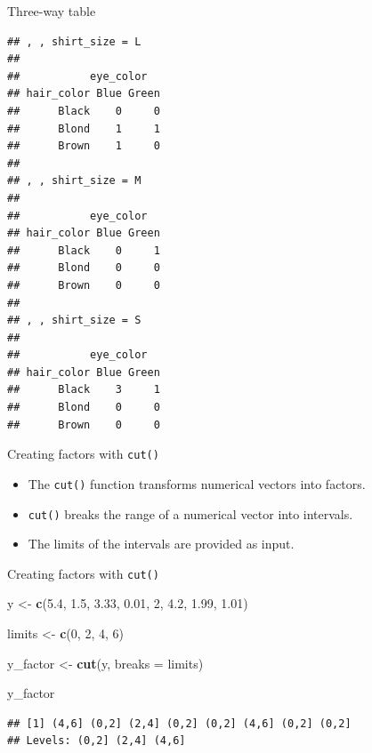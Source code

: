 \documentclass[ignorenonframetext,]{beamer}
\newenvironment{Shaded}{\begin{snugshade}}{\end{snugshade}}
\newcommand{\DataTypeTok}[1]{\textcolor[rgb]{0.13,0.29,0.53}{#1}}
\newcommand{\DecValTok}[1]{\textcolor[rgb]{0.00,0.00,0.81}{#1}}
\newcommand{\FloatTok}[1]{\textcolor[rgb]{0.00,0.00,0.81}{#1}}
\newcommand{\KeywordTok}[1]{\textcolor[rgb]{0.13,0.29,0.53}{\textbf{#1}}}
\newcommand{\NormalTok}[1]{#1}
\newcommand{\StringTok}[1]{\textcolor[rgb]{0.31,0.60,0.02}{#1}}
\providecommand{\tightlist}{%
  \setlength{\itemsep}{0pt}\setlength{\parskip}{0pt}}
\begin{document}
\begin{frame}[fragile]{Three-way table}
\protect\hypertarget{three-way-table-1}{}

\scriptsize

\begin{verbatim}
## , , shirt_size = L
## 
##           eye_color
## hair_color Blue Green
##      Black    0     0
##      Blond    1     1
##      Brown    1     0
## 
## , , shirt_size = M
## 
##           eye_color
## hair_color Blue Green
##      Black    0     1
##      Blond    0     0
##      Brown    0     0
## 
## , , shirt_size = S
## 
##           eye_color
## hair_color Blue Green
##      Black    3     1
##      Blond    0     0
##      Brown    0     0
\end{verbatim}

\normalsize

\end{frame}

\begin{frame}[fragile]{Creating factors with \texttt{cut()}}
\protect\hypertarget{creating-factors-with-cut}{}

\begin{itemize}
\tightlist
\item
  The \texttt{cut()} function transforms numerical vectors into factors.
\item
  \texttt{cut()} breaks the range of a numerical vector into intervals.
\item
  The limits of the intervals are provided as input.
\end{itemize}

\end{frame}

\begin{frame}[fragile]{Creating factors with \texttt{cut()}}
\protect\hypertarget{creating-factors-with-cut-1}{}

\begin{Shaded}
\begin{Highlighting}[]
\NormalTok{y <-}\StringTok{ }\KeywordTok{c}\NormalTok{(}\FloatTok{5.4}\NormalTok{, }\FloatTok{1.5}\NormalTok{, }\FloatTok{3.33}\NormalTok{, }\FloatTok{0.01}\NormalTok{, }\DecValTok{2}\NormalTok{, }\FloatTok{4.2}\NormalTok{, }\FloatTok{1.99}\NormalTok{, }\FloatTok{1.01}\NormalTok{)}

\NormalTok{limits <-}\StringTok{ }\KeywordTok{c}\NormalTok{(}\DecValTok{0}\NormalTok{, }\DecValTok{2}\NormalTok{, }\DecValTok{4}\NormalTok{, }\DecValTok{6}\NormalTok{)}

\NormalTok{y_factor <-}\StringTok{ }\KeywordTok{cut}\NormalTok{(y, }\DataTypeTok{breaks =}\NormalTok{ limits)}

\NormalTok{y_factor}
\end{Highlighting}
\end{Shaded}

\begin{verbatim}
## [1] (4,6] (0,2] (2,4] (0,2] (0,2] (4,6] (0,2] (0,2]
## Levels: (0,2] (2,4] (4,6]
\end{verbatim}

\end{frame}
\end{document}

